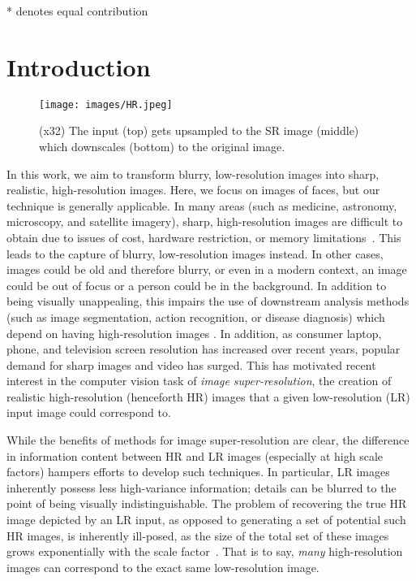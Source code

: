 \documentclass[10pt,twocolumn,letterpaper]{article}
\begin{document}
* denotes equal contribution

\section{Introduction}
\begin{figure}[!ht]
    \centering
    \texttt{[image: images/HR.jpeg]}\\
    \caption{(x32) The input (top) gets upsampled to the SR image (middle) which downscales (bottom) to the original image.}
    \label{fig:process}
\end{figure}

\noindent In this work, we aim to transform blurry, low-resolution images into sharp, realistic, high-resolution images. Here, we focus on images of faces, but our technique is generally applicable. In many areas (such as medicine, astronomy, microscopy, and satellite imagery), sharp, high-resolution images are difficult to obtain due to issues of cost, hardware restriction, or memory limitations~\cite{singh2016super}. This leads to the capture of blurry, low-resolution images instead. In other cases, images could be old and therefore blurry, or even in a modern context, an image could be out of focus or a person could be in the background. In addition to being visually unappealing, this impairs the use of downstream analysis methods (such as image segmentation, action recognition, or disease diagnosis) which depend on having high-resolution images \cite{unet} \cite{actrec}. In addition, as consumer laptop, phone, and television screen resolution has increased over recent years, popular demand for sharp images and video has surged. This has motivated recent interest in the computer vision task of \textit{image super-resolution}, the creation of realistic high-resolution (henceforth HR) images that a given low-resolution (LR) input image could correspond to.

While the benefits of methods for image super-resolution are clear, the difference in information content between HR and LR images (especially at high scale factors) hampers efforts to develop such techniques. In particular, LR images inherently possess less high-variance information; details can be blurred to the point of being visually indistinguishable. The problem of recovering the true HR image depicted by an LR input, as opposed to generating a set of potential such HR images, is inherently ill-posed, as the size of the total set of these images grows exponentially with the scale factor~\cite{baker2000limits}. That is to say, \textit{many} high-resolution images can correspond to the exact same low-resolution image.
\end{document}
